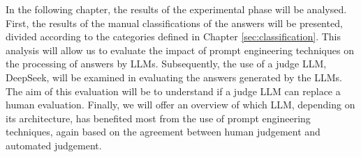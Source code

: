 In the following chapter, the results of the experimental phase will be analysed. First, the results of the manual classifications of the answers will be presented, divided according to the categories defined in Chapter \ref{sec:classification}. This analysis will allow us to evaluate the impact of prompt engineering techniques on the processing of answers by LLMs. Subsequently, the use of a judge LLM, DeepSeek, will be examined in evaluating the answers generated by the LLMs. The aim of this evaluation will be to understand if a judge LLM can replace a human evaluation. 
Finally, we will offer an overview of which LLM, depending on its architecture, has benefited most from the use of prompt engineering techniques, again based on the agreement between human judgement and automated judgement.
